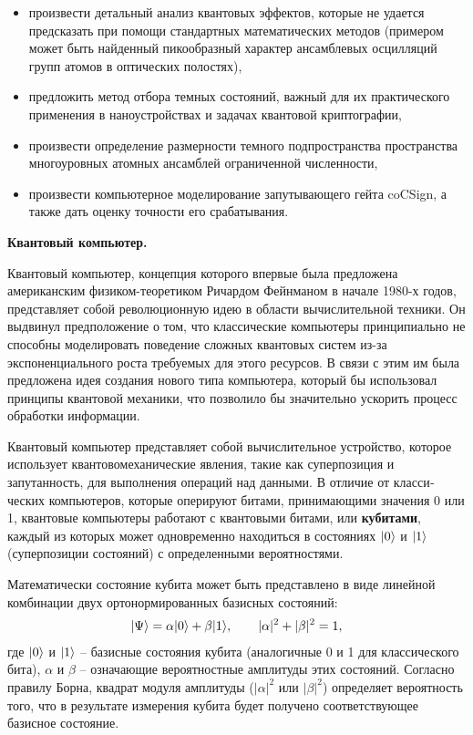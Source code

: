 \begin{itemize}
\item{произвести детальный анализ квантовых эффектов, которые не уда­ется предсказать при помощи стандартных математических методов (примером может быть найденный пикообразный характер ансамбле­вых осцилляций групп атомов в оптических полостях),}
\item{предложить метод отбора темных состояний, важный для их практи­ческого применения в наноустройствах и задачах квантовой криптогра­фии,}
\item{произвести определение размерности темного подпространства про­странства многоуровных атомных ансамблей ограниченной численно­сти,}
\item{произвести компьютерное моделирование запутывающего гейта coCSign, а также дать оценку точности его срабатывания.}
\end{itemize}

\clearpage
\indent\textbf{Квантовый компьютер.}

Квантовый компьютер, концепция которого впервые была предложена американским физиком-теоретиком Ричардом Фейнманом \cite{feynman} в начале 1980-х годов, представляет собой революционную идею в области вычислительной техники. Он выдвинул предположение о том, что классические компьютеры принципиально не способны моделировать поведение сложных квантовых си­стем из-за экспоненциального роста требуемых для этого ресурсов. В связи с этим им была предложена идея создания нового типа компьютера, который бы использовал принципы квантовой механики, что позволило бы значительно ускорить процесс обработки информации.

Квантовый компьютер представляет собой вычислительное устройство, которое использует квантовомеханические явления, такие как суперпозиция и запутанность, для выполнения операций над данными. В отличие от класси­ческих компьютеров, которые оперируют битами, принимающими значения 0 или 1, квантовые компьютеры работают с квантовыми битами, или \textbf{кубитами}, каждый из которых может одновременно находиться в состояниях $|0\rangle$ и $|1\rangle$ (суперпозиции состояний) с определенными вероятностями.

Математически состояние кубита может быть представлено в виде линей­ной комбинации двух ортонормированных базисных состояний:
\begin{align*}
	|\Psi\rangle = \alpha|0\rangle + \beta|1\rangle,\qquad|\alpha|^2 + |\beta|^2 = 1,
\end{align*}
где $|0\rangle$ и $|1\rangle$ -- базисные состояния кубита (аналогичные 0 и 1 для классического бита), $\alpha$ и $\beta$ -- означающие вероятностные амплитуды этих состояний. Согласно правилу Борна, квадрат модуля амплитуды ($|\alpha|^2$ или $|\beta|^2$) определяет вероятность того, что в результате измерения кубита будет получено соответствующее базисное состояние.

